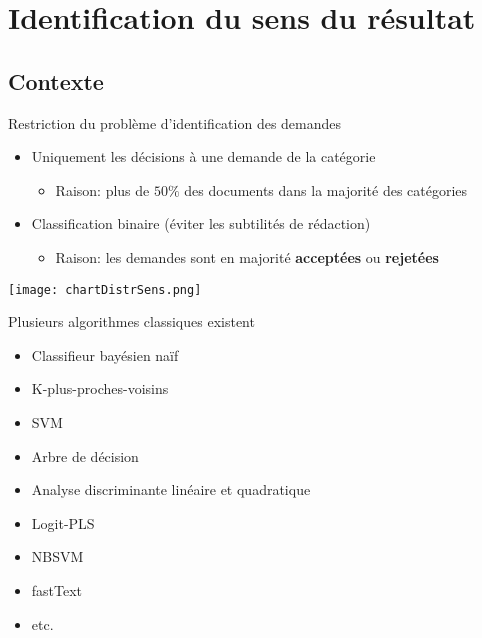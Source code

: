 \section{Identification du sens du résultat}


\subsection{Contexte}

\begin{frame}[t]{\mysubsectiontitle}
	Restriction du problème d'identification des demandes
\begin{itemize}	\small
	\item Uniquement les décisions à une demande de la catégorie
	\begin{itemize}\scriptsize
		\item Raison: plus de $50\%$ des documents dans la majorité des catégories
	\end{itemize}
	\item Classification binaire (éviter les subtilités de rédaction)
	\begin{itemize} \scriptsize
		\item Raison: les demandes sont en majorité \textbf{acceptées} ou \textbf{rejetées}
	\end{itemize}
\end{itemize}
\centering \texttt{[image: chartDistrSens.png]}
\end{frame}

\begin{frame}[t]{\mysubsectiontitle}
	Plusieurs algorithmes classiques existent
	\begin{itemize} \small
		\item Classifieur bayésien naïf \cite{duda1973patternclass} 
		\item K-plus-proches-voisins \cite{cover1967knn}
		\item SVM \cite{vapnik1995statlearning}
		\item Arbre de décision
		\item Analyse discriminante linéaire \cite{fisher1936linearDA} et quadratique \cite{McLachlan1992DiscrAnalyStatPattRecog-QDA}
		\item Logit-PLS \cite{tenenhaus2005logitpls}
		\item NBSVM \cite{wang2012nbsvm}
		\item fastText \cite{grave2017fasttextcls}
		\item etc.	
	\end{itemize}
\end{frame}


